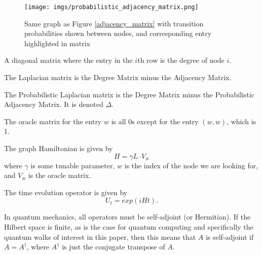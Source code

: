 \begin{figure}[H]
    \centering
    \texttt{[image: imgs/probabilistic\_adjacency\_matrix.png]}
    \caption[Adjacency Matrix]{Same graph as Figure \ref{adjacency_matrix} with transition probabilities shown between nodes, and corresponding entry highlighted in matrix}
    \label{probabilistic_adjacency_matrix}
\end{figure}
\begin{definition}
A diagonal matrix where the entry in the $i$th row is the degree of node $i$.
\end{definition}

\begin{definition}
The Laplacian matrix is the Degree Matrix minus the Adjacency Matrix.
\end{definition}

\begin{definition}
The Probabilistic Laplacian matrix is the Degree Matrix minus the Probabilistic Adjacency Matrix.
It is denoted $\Delta$.
\end{definition}

\begin{definition}
The oracle matrix for the entry $w$ is all 0s except for the entry $(w, w)$, which is 1. 
\end{definition}

\begin{definition}
The graph Hamiltonian is given by
$$
H = \gamma L – V_w
$$
where $\gamma$ is some tunable parameter, $w$ is the index of the node we are looking for, and $V_w$ is the oracle matrix.
\end{definition}

\begin{definition}
The time evolution operator is given by
$$
U_t = exp(iHt).
$$
\end{definition}

In quantum mechanics, all operators must be self-adjoint (or Hermitian). 
If the Hilbert space is finite, as is the case for quantum computing and specifically the quantum walks of interest in this paper, then this means that $A$ is self-adjoint if $A=A^{\dag}$, where $A^{\dag}$ is just the conjugate transpose of $A$.

